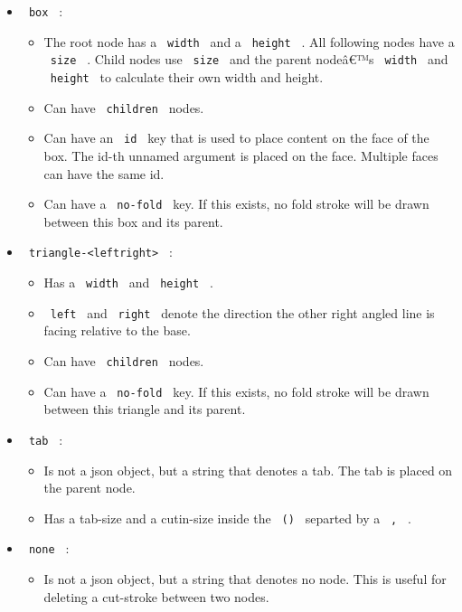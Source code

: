\begin{itemize}
\tightlist
\item
  \texttt{\ box\ } :

  \begin{itemize}
  \tightlist
  \item
    The root node has a \texttt{\ width\ } and a \texttt{\ height\ } .
    All following nodes have a \texttt{\ size\ } . Child nodes use
    \texttt{\ size\ } and the parent nodeâ€™s \texttt{\ width\ } and
    \texttt{\ height\ } to calculate their own width and height.
  \item
    Can have \texttt{\ children\ } nodes.
  \item
    Can have an \texttt{\ id\ } key that is used to place content on the
    face of the box. The id-th unnamed argument is placed on the face.
    Multiple faces can have the same id.
  \item
    Can have a \texttt{\ no-fold\ } key. If this exists, no fold stroke
    will be drawn between this box and its parent.
  \end{itemize}
\item
  \texttt{\ triangle-\textless{}left\textbar{}right\textgreater{}\ } :

  \begin{itemize}
  \tightlist
  \item
    Has a \texttt{\ width\ } and \texttt{\ height\ } .
  \item
    \texttt{\ left\ } and \texttt{\ right\ } denote the direction the
    other right angled line is facing relative to the base.
  \item
    Can have \texttt{\ children\ } nodes.
  \item
    Can have a \texttt{\ no-fold\ } key. If this exists, no fold stroke
    will be drawn between this triangle and its parent.
  \end{itemize}
\item
  \texttt{\ tab\ } :

  \begin{itemize}
  \tightlist
  \item
    Is not a json object, but a string that denotes a tab. The tab is
    placed on the parent node.
  \item
    Has a tab-size and a cutin-size inside the \texttt{\ ()\ } separted
    by a \texttt{\ ,\ } .
  \end{itemize}
\item
  \texttt{\ none\ } :

  \begin{itemize}
  \tightlist
  \item
    Is not a json object, but a string that denotes no node. This is
    useful for deleting a cut-stroke between two nodes.
  \end{itemize}
\end{itemize}

